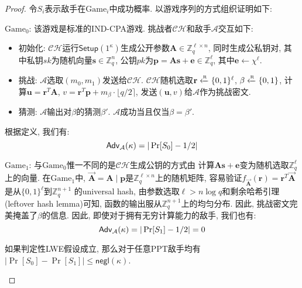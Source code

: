 \begin{proof}
令$S_i$表示敌手在$\text{Game}_i$中成功概率. 以游戏序列的方式组织证明如下:
\begin{trivlist}
\item $\text{Game}_0$: 该游戏是标准的IND-CPA游戏. 
	挑战者$\mathcal{CH}$和敌手$\mathcal{A}$交互如下: 
	\begin{itemize}
		\item 初始化: $\mathcal{CH}$运行$\mathsf{Setup}(1^\kappa)$生成公开参数$\mathbf{A} \in \mathbb{Z}_q^{\ell \times n}$, 
			同时生成公私钥对, 其中私钥$sk$为随机向量$\mathbf{s} \in \mathbb{Z}_q^n$, 
			公钥$pk$为$\mathbf{p} = \mathbf{A}\mathbf{s}+\mathbf{e} \in \mathbb{Z}_q^\ell$, 
			其中$\mathbf{e} \leftarrow \chi^\ell$.  

		\item 挑战: $\mathcal{A}$选取$(m_0, m_1)$发送给$\mathcal{CH}$. 
			$\mathcal{CH}$随机选取$\mathbf{r} \xleftarrow{\textup{\tiny R}} \{0,1\}^\ell$, $\beta \xleftarrow{\textup{\tiny R}} \{0,1\}$,  
			计算$\mathbf{u} = \mathbf{r}^T \mathbf{A}$, 
			$v = \mathbf{r}^T \mathbf{p} + m_\beta \cdot \lfloor q/2 \rceil$, 
			发送$(\mathbf{u}, v)$给$\mathcal{A}$作为挑战密文. 

		\item 猜测: $\mathcal{A}$输出对$\beta$的猜测$\beta'$. $\mathcal{A}$成功当且仅当$\beta = \beta'$. 
	\end{itemize} 
根据定义, 我们有: 
\begin{equation*}
\mathsf{Adv}_\mathcal{A}(\kappa) = |\Pr[S_0] - 1/2|
\end{equation*}  

\item $\text{Game}_1$: 与$\text{Game}_0$惟一不同的是$\mathcal{CH}$生成公钥的方式由
	计算$\mathbf{A}\mathbf{s}+\mathbf{e}$变为随机选取$\mathbb{Z}_q^\ell$上的向量. 
	在$\text{Game}_1$中, $\vec{\mathbf{A}} = \mathbf{A} \mid \mathbf{p}$是$\mathbb{Z}_q^{\ell \times n}$上的随机矩阵, 
	容易验证$f_{\vec{\mathbf{A}}}(\mathbf{r}) = \mathbf{r}^T \vec{\mathbf{A}}$是从$\{0,1\}^\ell$到$\mathbb{Z}_q^{n+1}$
	的universal hash, 由参数选取$\ell > n \log q$和剩余哈希引理(leftover hash lemma)可知, 
	函数的输出服从$\mathbb{Z}_q^{n+1}$上的均匀分布. 因此, 挑战密文完美掩盖了$\beta$的信息. 
	因此, 即使对于拥有无穷计算能力的敌手, 我们也有: 
\begin{equation*}
\mathsf{Adv}_\mathcal{A}(\kappa) = |\Pr[S_1] - 1/2| = 0
\end{equation*} 
\end{trivlist}

\begin{claim}
如果判定性LWE假设成立, 那么对于任意PPT敌手均有$|\Pr[S_0] - \Pr[S_1]| \leq \mathsf{negl}(\kappa)$. 
\end{claim}


\end{proof}
